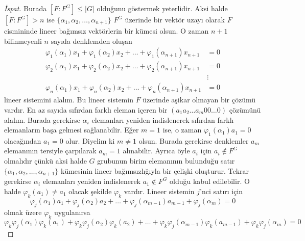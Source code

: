 \documentclass{article}
\theoremstyle{definition}
\theoremstyle{remark}
\newcommand{\envert}[1]{\left\lvert#1\right\rvert}
\let\abs=\envert
\begin{document}
    		\begin{proof}[İspat]
    	        Burada $[F : F^G] \leq \abs{G}$ olduğunu göstermek yeterlidir. Aksi halde $[F : F^G] > n$ ise $\{\alpha_1, \alpha_2, \dots, \alpha_{n + 1}\}$ $F^G$ üzerinde bir vektör uzayı olarak $F$ cismininde lineer bağımsız vektörlerin bir kümesi olsun. O zaman $n + 1$ bilinmeyenli $n$ sayıda denklemden oluşan
    	        \begin{align*}
    	            \varphi_1(\alpha_1)x_1 + \varphi_1(\alpha_2)x_2 + \dots + \varphi_1(\alpha_{n + 1})x_{n + 1} &= 0\\
    	            \varphi_2(\alpha_1)x_1 + \varphi_2(\alpha_2)x_2 + \dots + \varphi_2(\alpha_{n + 1})x_{n + 1} &= 0\\
    	            &\vdots\\
    	            \varphi_n(\alpha_1)x_1 + \varphi_n(\alpha_2)x_2 + \dots + \varphi_n(\alpha_{n + 1})x_{n + 1} &= 0
    	        \end{align*}
    	        lineer sistemini alalım. Bu lineer sistemin $F$ üzerinde aşikar olmayan bir çözümü vardır. En az sayıda sıfırdan farklı eleman içeren bir $(a_1 a_2 \dots a_m 0 0 \dots 0)$ çözümünü alalım. Burada gerekirse $\alpha_i$ elemanları yeniden indislenerek sıfırdan farklı elemanların başa gelmesi sağlanabilir. Eğer $m = 1$ ise, o zaman $\varphi_1(\alpha_1)a_1 = 0$ olacağından $a_1 = 0$ olur. Diyelim ki $m \neq 1$ olsun. Burada gerekirse denklemler $a_m$ elemanının tersiyle çarpılarak $a_m = 1$ alınabilir. Ayrıca öyle $a_i$ için $a_i \notin F^G$ olmalıdır çünkü aksi halde $G$ grubunun birim elemanının bulunduğu satır $\{\alpha_1, \alpha_2, \dots, \alpha_{n + 1}\}$ kümesinin lineer bağımsızlığıyla bir çelişki oluşturur. Tekrar gerekirse $\alpha_i$ elemanları yeniden indislenerek $a_1 \notin F^G$ olduğu kabul edilebilir. O halde $\varphi_k(a_1) \neq a_1$ olacak şekilde $\varphi_k$ vardır. Lineer sistemin $j$'nci satırı için
    	        \begin{equation*}
    	            \varphi_j(\alpha_1)a_1 + \varphi_j(\alpha_2)a_2 + \dots + \varphi_j(\alpha_{m - 1})a_{m - 1} + \varphi_j(\alpha_m) = 0
    	        \end{equation*}
    	        olmak üzere $\varphi_k$ uygulanırsa
    	        \begin{equation*}
    	            \varphi_k\varphi_j(\alpha_1)\varphi_k(a_1) + \varphi_k\varphi_j(\alpha_2)\varphi_k(a_2) + \dots + \varphi_k\varphi_j(\alpha_{m - 1})\varphi_k(a_{m - 1}) + \varphi_k\varphi_j(\alpha_m) = 0
    	        \end{equation*}

\end{proof}
\end{document}
